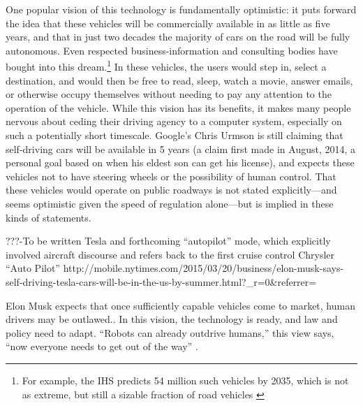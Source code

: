 One popular vision of this technology is fundamentally optimistic: it
puts forward the
idea that these vehicles will be commercially available in as little
as five years, and that in just two decades the majority of cars on the road will be
fully autonomous. Even respected business-information and consulting
bodies have bought into this dream.\footnote{For example, the IHS
  predicts 54 million such vehicles by 2035, which is not as extreme,
  but still a sizable fraction of road vehicles \cite{IHSstudy}} In
these vehicles, the users would 
step in, select a destination, and would then be free to read, sleep,
watch a movie, answer emails, or otherwise occupy themselves without
needing to pay any attention to the operation of the vehicle. While this
vision has its benefits, it makes many people nervous about
ceding their driving agency to a computer system, especially on such a
potentially short timescale.\cite{clytton} Google's Chris Urmson is
still claiming that self-driving cars will be available in 5 years (a
claim first made in August, 2014, a personal goal based on when his
eldest son can get his license\cite{???-GomesHidden}), and expects
these vehicles not to have steering wheels or the possibility of human
control. That these vehicles would operate on public roadways is not
stated explicitly---and seems optimistic given the speed of regulation
alone---but is implied in these kinds of statements. 

???-To be written
Tesla and forthcoming ``autopilot'' mode, which explicitly involved aircraft
discourse and refers back to the first cruise control Chrysler ``Auto Pilot''
http://mobile.nytimes.com/2015/03/20/business/elon-musk-says-self-driving-tesla-cars-will-be-in-the-us-by-summer.html?\_r=0\&referrer=

Elon Musk expects
that once sufficiently capable vehicles 
come to market, human drivers may be
outlawed.\cite{???-http://www.forbes.com/sites/leoking/2015/03/19/googles-gargantuan-push-for-cars-with-no-steering-wheel-by-2020/}.
In this vision, the technology is ready, and law and policy need to
adapt. ``Robots can already outdrive humans,'' this view says, ``now
everyone needs to get out of the way''
\cite{???-http://www.popsci.com/cars/article/2013-09/google-self-driving-car}. 


